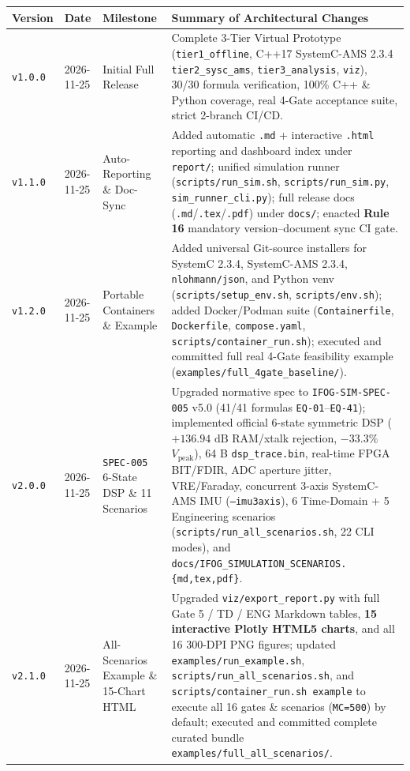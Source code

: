 \documentclass[11pt,a4paper]{article}
\begin{document}
\vspace{0.5em}
\begin{tabularx}{\textwidth}{@{}p{1.4cm} p{2.0cm} p{3.2cm} X@{}}
\toprule
\textbf{Version} & \textbf{Date} & \textbf{Milestone} & \textbf{Summary of Architectural Changes} \\
\midrule
\texttt{v1.0.0} & 2026-11-25 & Initial Full Release & Complete 3-Tier Virtual Prototype (\texttt{tier1\_offline}, C++17 SystemC-AMS 2.3.4 \texttt{tier2\_sysc\_ams}, \texttt{tier3\_analysis}, \texttt{viz}), 30/30 formula verification, 100\% C++ \& Python coverage, real 4-Gate acceptance suite, strict 2-branch CI/CD. \\
\texttt{v1.1.0} & 2026-11-25 & Auto-Reporting \& Doc-Sync & Added automatic \texttt{.md} + interactive \texttt{.html} reporting and dashboard index under \texttt{report/}; unified simulation runner (\texttt{scripts/run\_sim.sh}, \texttt{scripts/run\_sim.py}, \texttt{sim\_runner\_cli.py}); full release docs (\texttt{.md}/\texttt{.tex}/\texttt{.pdf}) under \texttt{docs/}; enacted \textbf{Rule 16} mandatory version--document sync CI gate. \\
\texttt{v1.2.0} & 2026-11-25 & Portable Containers \& Example & Added universal Git-source installers for SystemC 2.3.4, SystemC-AMS 2.3.4, \texttt{nlohmann/json}, and Python venv (\texttt{scripts/setup\_env.sh}, \texttt{scripts/env.sh}); added Docker/Podman suite (\texttt{Containerfile}, \texttt{Dockerfile}, \texttt{compose.yaml}, \texttt{scripts/container\_run.sh}); executed and committed full real 4-Gate feasibility example (\texttt{examples/full\_4gate\_baseline/}). \\
\texttt{v2.0.0} & 2026-11-25 & \texttt{SPEC-005} 6-State DSP \& 11 Scenarios & Upgraded normative spec to \texttt{IFOG-SIM-SPEC-005} v5.0 (41/41 formulas \texttt{EQ-01}--\texttt{EQ-41}); implemented official 6-state symmetric DSP ($+136.94\text{ dB}$ RAM/xtalk rejection, $-33.3\%$ $V_{\text{peak}}$), 64 B \texttt{dsp\_trace.bin}, real-time FPGA BIT/FDIR, ADC aperture jitter, VRE/Faraday, concurrent 3-axis SystemC-AMS IMU (\texttt{--imu3axis}), 6 Time-Domain + 5 Engineering scenarios (\texttt{scripts/run\_all\_scenarios.sh}, 22 CLI modes), and \texttt{docs/IFOG\_SIMULATION\_SCENARIOS.\{md,tex,pdf\}}. \\
\texttt{v2.1.0} & 2026-11-25 & All-Scenarios Example \& 15-Chart HTML & Upgraded \texttt{viz/export\_report.py} with full Gate 5 / TD / ENG Markdown tables, \textbf{15 interactive Plotly HTML5 charts}, and all 16 300-DPI PNG figures; updated \texttt{examples/run\_example.sh}, \texttt{scripts/run\_all\_scenarios.sh}, and \texttt{scripts/container\_run.sh example} to execute all 16 gates \& scenarios (\texttt{MC=500}) by default; executed and committed complete curated bundle \texttt{examples/full\_all\_scenarios/}. \\

\end{tabularx}
\end{document}
